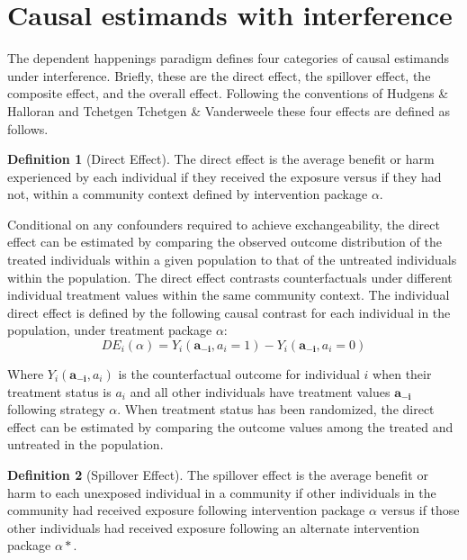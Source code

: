 \documentclass{article}
\theoremstyle{definition}
\newtheorem{definition}{Definition}[section]
\begin{document}
\section{Causal estimands with interference}
The dependent happenings paradigm defines four categories of causal estimands under interference. Briefly, these are the direct effect, the spillover effect, the composite effect, and the overall effect. Following the conventions of Hudgens \& Halloran \cite{hudgens_toward_2008} and Tchetgen Tchetgen \& Vanderweele \cite{tchetgen_tchetgen_causal_2012} these four effects are defined as follows. 

\begin{definition}[Direct Effect]The direct effect is the average benefit or harm experienced by each individual if they received the exposure versus if they had not, within a community context defined by intervention package $\alpha$. 
\end{definition}
Conditional on any confounders required to achieve exchangeability, the direct effect can be estimated by comparing the observed outcome distribution of the treated individuals within a given population to that of the untreated individuals within the population. The direct effect contrasts counterfactuals under different individual treatment values within the same community context. The individual direct effect is defined by the following causal contrast for each individual in the population, under treatment package $\alpha$:
\begin{equation}\label{eq:1}
   DE_{i}\left(\alpha\right) = Y_{i}\left(\mathbf{a_{-i}}, a_{i} = 1\right) - Y_{i}\left(\mathbf{a_{-i}}, a_{i} = 0\right)	
\end{equation}
	
Where $Y_{i}(\mathbf{a_{-i}},a_{i})$ is the counterfactual outcome for individual $i$ when their treatment status is $a_{i}$ and all other individuals have treatment values $\mathbf{a_{-i}}$ following strategy $\alpha$. When treatment status has been randomized, the direct effect can be estimated by comparing the outcome values among the treated and untreated in the population. 

\begin{definition}[Spillover Effect] The spillover effect is the average benefit or harm to each unexposed individual in a community if other individuals in the community had received exposure following intervention package $\alpha$ versus if those other individuals had received exposure following an alternate intervention package $\alpha*$. 
\end{definition}
\end{document}
